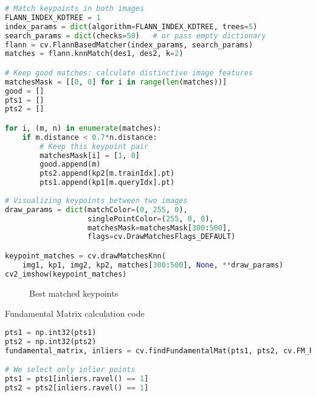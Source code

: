 \begin{center}{\begin{minipage}{0.9\linewidth}
\begin{lstlisting}[language=Python, basicstyle=\fontsize{8}{10}\selectfont\ttfamily]
# Match keypoints in both images
FLANN_INDEX_KDTREE = 1
index_params = dict(algorithm=FLANN_INDEX_KDTREE, trees=5)
search_params = dict(checks=50)   # or pass empty dictionary
flann = cv.FlannBasedMatcher(index_params, search_params)
matches = flann.knnMatch(des1, des2, k=2)

# Keep good matches: calculate distinctive image features
matchesMask = [[0, 0] for i in range(len(matches))]
good = []
pts1 = []
pts2 = []

for i, (m, n) in enumerate(matches):
    if m.distance < 0.7*n.distance:
        # Keep this keypoint pair
        matchesMask[i] = [1, 0]
        good.append(m)
        pts2.append(kp2[m.trainIdx].pt)
        pts1.append(kp1[m.queryIdx].pt)
        
# Visualizing keypoints between two images
draw_params = dict(matchColor=(0, 255, 0),
                   singlePointColor=(255, 0, 0),
                   matchesMask=matchesMask[300:500],
                   flags=cv.DrawMatchesFlags_DEFAULT)

keypoint_matches = cv.drawMatchesKnn(
    img1, kp1, img2, kp2, matches[300:500], None, **draw_params)
cv2_imshow(keypoint_matches)
\end{lstlisting}
\end{minipage}}\end{center}

\begin{figure}[H]
\centering
\subfloat{\texttt{[image: 3]}}
\caption{Best matched keypoints}
\end{figure}

Fundamental Matrix calculation code

\begin{center}{\begin{minipage}{0.9\linewidth}
\begin{lstlisting}[language=Python, basicstyle=\fontsize{8}{10}\selectfont\ttfamily]
pts1 = np.int32(pts1)
pts2 = np.int32(pts2)
fundamental_matrix, inliers = cv.findFundamentalMat(pts1, pts2, cv.FM_RANSAC)

# We select only inlier points
pts1 = pts1[inliers.ravel() == 1]
pts2 = pts2[inliers.ravel() == 1]
\end{lstlisting}
\end{minipage}}\end{center}

